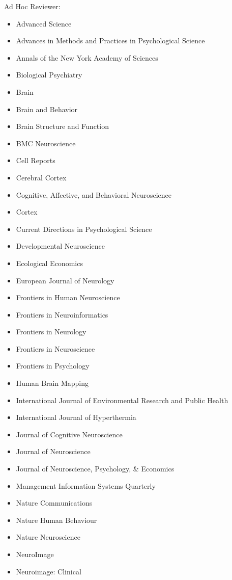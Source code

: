 \documentclass[11pt, letterpaper]{article}
\begin{document}
Ad Hoc Reviewer:
\begin{multicols}{2}
\begin{itemize}[noitemsep]
\itshape
\item Advanced Science
\item Advances in Methods and Practices in Psychological Science
\item Annals of the New York Academy of Sciences
\item Biological Psychiatry
\item Brain
\item Brain and Behavior
\item Brain Structure and Function
\item BMC Neuroscience 
\item Cell Reports
\item Cerebral Cortex 
\item Cognitive, Affective, and Behavioral Neuroscience 
\item Cortex
\item Current Directions in Psychological Science
\item Developmental Neuroscience 
\item Ecological Economics
\item European Journal of Neurology
\item Frontiers in Human Neuroscience 
\item Frontiers in Neuroinformatics 
\item Frontiers in Neurology 
\item Frontiers in Neuroscience 
\item Frontiers in Psychology 
\item Human Brain Mapping 
\item International Journal of Environmental Research and Public Health
\item International Journal of Hyperthermia 
\item Journal of Cognitive Neuroscience 
\item Journal of Neuroscience 
\item Journal of Neuroscience, Psychology, \& Economics
\item Management Information Systems Quarterly 
\item Nature Communications 
\item Nature Human Behaviour 
\item Nature Neuroscience
\item NeuroImage 
\item Neuroimage: Clinical 

\end{itemize}
\end{multicols}
\end{document}
